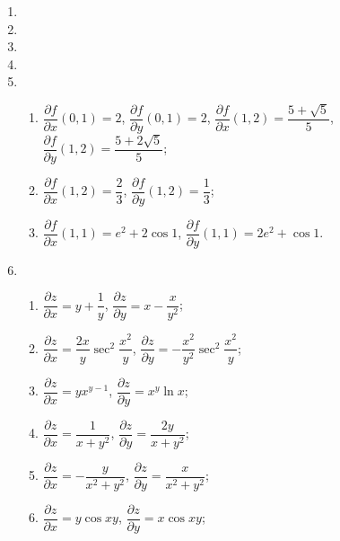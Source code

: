 \documentclass[a4paper, 11pt]{ctexart}
\begin{document}
\begin{enumerate}
    \item %
    \item %
    \item %
    \item %
    \item %
        \begin{enumerate}[(1)]
            \item %
                $\dfrac{\partial{f}}{\partial{x}}(0,1) = 2$,
                $\dfrac{\partial{f}}{\partial{y}}(0,1) = 2$,
                $\dfrac{\partial{f}}{\partial{x}}(1,2) = \dfrac{5 + \sqrt{5}}{5}$,
                $\dfrac{\partial{f}}{\partial{y}}(1,2) = \dfrac{5 + 2\sqrt{5}}{5}$;
            \item %
                $\dfrac{\partial{f}}{\partial{x}}(1,2) = \dfrac23$,
                $\dfrac{\partial{f}}{\partial{y}}(1,2) = \dfrac13$;
            \item %
                $\dfrac{\partial{f}}{\partial{x}}(1,1) = e^2 + 2\cos{1}$,
                $\dfrac{\partial{f}}{\partial{y}}(1,1) = 2e^2 + \cos{1}$.
        \end{enumerate}
    \item %
        \begin{enumerate}[(1)]
            \item %
                $\dfrac{\partial{z}}{\partial{x}} = y + \dfrac1y$,
                $\dfrac{\partial{z}}{\partial{y}} = x - \dfrac{x}{y^2}$;
            \item %
                $\dfrac{\partial{z}}{\partial{x}} = \dfrac{2x}{y}\sec^2\dfrac{x^2}{y}$,
                $\dfrac{\partial{z}}{\partial{y}} = -\dfrac{x^2}{y^2}\sec^2\dfrac{x^2}{y}$;
            \item %
                $\dfrac{\partial{z}}{\partial{x}} = yx^{y-1}$,
                $\dfrac{\partial{z}}{\partial{y}} = x^y\ln{x}$;
            \item %
                $\dfrac{\partial{z}}{\partial{x}} = \dfrac{1}{x + y^2}$,
                $\dfrac{\partial{z}}{\partial{y}} = \dfrac{2y}{x + y^2}$;
            \item %
                $\dfrac{\partial{z}}{\partial{x}} = -\dfrac{y}{x^2 + y^2}$,
                $\dfrac{\partial{z}}{\partial{y}} = \dfrac{x}{x^2 + y^2}$;
            \item %
                $\dfrac{\partial{z}}{\partial{x}} = y\cos{xy}$,
                $\dfrac{\partial{z}}{\partial{y}} = x\cos{xy}$;

\end{enumerate}
\end{enumerate}
\end{document}
